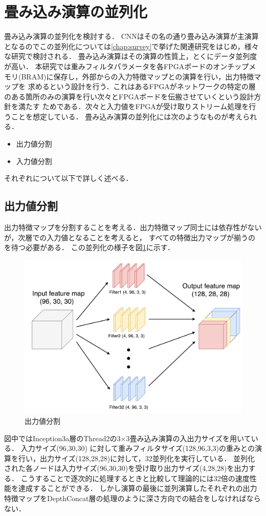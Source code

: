 {\section{畳み込み演算の並列化}
\label{sec:conv_para}
畳み込み演算の並列化を検討する．
CNNはその名の通り畳み込み演算が主演算となるのでこの並列化については\ref{chap:survey}で挙げた関連研究をはじめ，様々な研究で検討される．
畳み込み演算はその演算の性質上，とくにデータ並列度が高い．
本研究では重みフィルタパラメータを各FPGAボードのオンチップメモリ(BRAM)に保存し，外部からの入力特徴マップとの演算を行い，出力特徴マップを
求めるという設計を行う．これはあるFPGAがネットワークの特定の層のある箇所のみの演算を行い次々とFPGAボードを伝搬させていくという設計方針を満たす
ためである．次々と入力値をFPGAが受け取りストリーム処理を行うことを想定している．
畳み込み演算の並列化には次のようなものが考えられる．
\begin{itemize}
    \item 出力値分割
    \item 入力値分割
\end{itemize}
それぞれについて以下で詳しく述べる．
\subsection{出力値分割}
\label{subsec:para_output}
出力特徴マップを分割することを考える．出力特徴マップ同士には依存性がないが，次層での入力値となることを考えると，
すべての特徴出力マップが揃うのを待つ必要がある．
この並列化の様子を図\ref{fig:conv_para_output}に示す．
\begin{figure}[h]
    \centering
    \includegraphics[width=12cm]{./chap5/fig/conv_para_output.pdf}
    \caption{出力値分割}
    \label{fig:conv_para_output}
\end{figure}
図中ではInception3a層のThread2の3$\times$3畳み込み演算の入出力サイズを用いている．
入力サイズ(96,30,30) に対して重みフィルタサイズ(128,96,3,3)の重みとの演算を行い，出力サイズ(128,28,28)に対して，32並列化を実行している．
並列化された各ノードは入力サイズ(96,30,30)を受け取り出力サイズ(4,28,28)を出力する．
こうすることで逐次的に処理するときと比較して理論的には32倍の速度性能を達成することができる．
しかし演算の最後に並列演算したそれぞれの出力特徴マップをDepthConcat層の処理のように深さ方向での結合をしなければならない．
}
